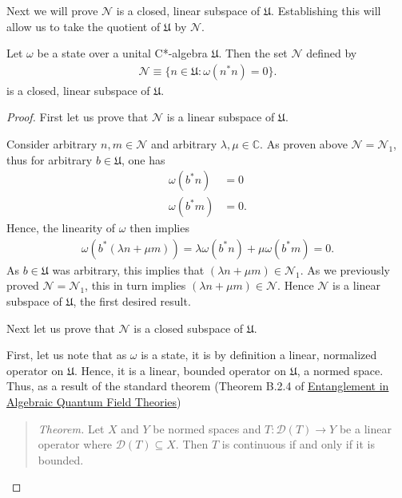 Next we will prove $\mathcal{N}$ is a closed, linear subspace of $\mathfrak{U}$. Establishing this will allow us to take the quotient of $\mathfrak{U}$ by $\mathcal{N}$.

\begin{lemma}
    \label{lmm:lmm2}
    \leanok
    Let $\omega$ be a state over a unital C*-algebra $\mathfrak{U}$. Then the set $\mathcal{N}$ defined by
    \begin{align}
        \mathcal{N} \equiv \{ n \in \mathfrak{U} : \omega(n^*n) = 0 \}.
    \end{align}
    is a closed, linear subspace of $\mathfrak{U}$.
\end{lemma}
\begin{proof}
\leanok
First let us prove that $\mathcal{N}$ is a linear subspace of $\mathfrak{U}$.

Consider arbitrary $n,m \in \mathcal{N}$ and arbitrary $\lambda, \mu \in \mathbb{C}$. As proven above $\mathcal{N} = \mathcal{N}_1$, thus for arbitrary $b \in \mathfrak{U}$, one has
\begin{align}
    \omega(b^*n) &= 0 \\
    \omega(b^*m) &= 0.
\end{align}
Hence, the linearity of $\omega$ then implies
\begin{align}
    \omega(b^*(\lambda n + \mu m)) = \lambda \omega(b^*n) + \mu \omega(b^*m) = 0.
\end{align}
As $b \in \mathfrak{U}$ was arbitrary, this implies that $(\lambda n + \mu m) \in \mathcal{N}_1$. As we previously proved $\mathcal{N} = \mathcal{N}_1$, this in turn implies $(\lambda n + \mu m) \in \mathcal{N}$. Hence $\mathcal{N}$ is a linear subspace of $\mathfrak{U}$, the first desired result.

Next let us prove that $\mathcal{N}$ is a closed subspace of $\mathfrak{U}$.

First, let us note that as $\omega$ is a state, it is by definition a linear, normalized operator on $\mathfrak{U}$. Hence, it is a linear, bounded operator on $\mathfrak{U}$, a normed space. Thus, as a result of the standard theorem (Theorem B.2.4 of \href{https://arxiv.org/abs/2410.16599}{Entanglement in Algebraic Quantum Field Theories})

\begin{quote}
    \textit{Theorem.} Let $X$ and $Y$ be normed spaces and $T: \mathcal{D}(T) \rightarrow Y$ be a linear operator where $\mathcal{D}(T) \subseteq X$. Then $T$ is continuous if and only if it is bounded.
\end{quote}


\end{proof}
